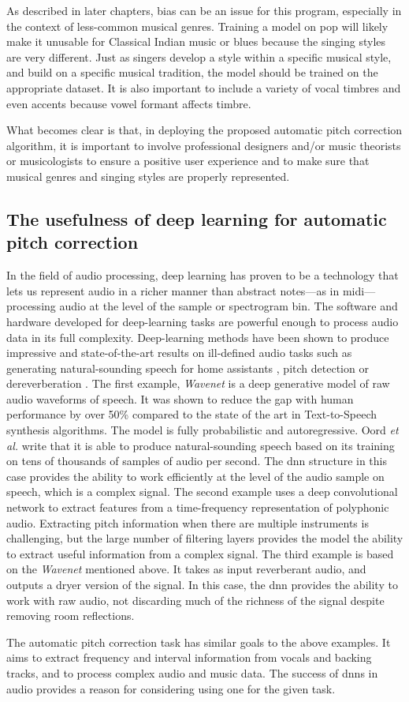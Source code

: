 As described in later chapters, bias can be an issue for this program, especially in the context of less-common musical genres. Training a model on pop will likely make it unusable for Classical Indian music or blues because the singing styles are very different. Just as singers develop a style within a specific musical style, and build on a specific musical tradition, the model should be trained on the appropriate dataset. It is also important to include a variety of vocal timbres and even accents because vowel formant affects timbre. 

What becomes clear is that, in deploying the proposed automatic pitch correction algorithm, it is important to involve professional designers and/or music theorists or musicologists to ensure a positive user experience and to make sure that musical genres and singing styles are properly represented.

\subsection{The usefulness of deep learning for automatic pitch correction}
In the field of audio processing, deep learning has proven to be a technology that lets us represent audio in a richer manner than abstract notes---as in \gls{midi}---processing audio at the level of the sample or spectrogram bin. The software and hardware developed for deep-learning tasks are powerful enough to process audio data in its full complexity. Deep-learning methods have been shown to produce impressive and state-of-the-art results on ill-defined audio tasks such as generating natural-sounding speech for home assistants \cite{oord2016wavenet}, pitch detection \cite{bittner2017deep} or dereverberation \cite{su2020hifi}. The first example, \textit{Wavenet} is a deep generative model of raw audio waveforms of speech. It was shown to reduce the gap with human performance by over 50\% compared to the state of the art in Text-to-Speech synthesis algorithms. The model is fully probabilistic and autoregressive. Oord \textit{et al.} write that it is able to produce natural-sounding speech based on its training on tens of thousands of samples of audio per second. The \gls{dnn} structure in this case provides the ability to work efficiently at the level of the audio sample on speech, which is a complex signal. The second example uses a deep convolutional network to extract features from a time-frequency representation of polyphonic audio. Extracting pitch information when there are multiple instruments is challenging, but the large number of filtering layers provides the model the ability to extract useful information from a complex signal. The third example is based on the \textit{Wavenet} mentioned above. It takes as input reverberant audio, and outputs a dryer version of the signal. In this case, the \gls{dnn} provides the ability to work with raw audio, not discarding much of the richness of the signal despite removing room reflections.

The automatic pitch correction task has similar goals to the above examples. It aims to extract frequency and interval information from vocals and backing tracks, and to process complex audio and music data. The success of \gls{dnn}s in audio provides a reason for considering using one for the given task.